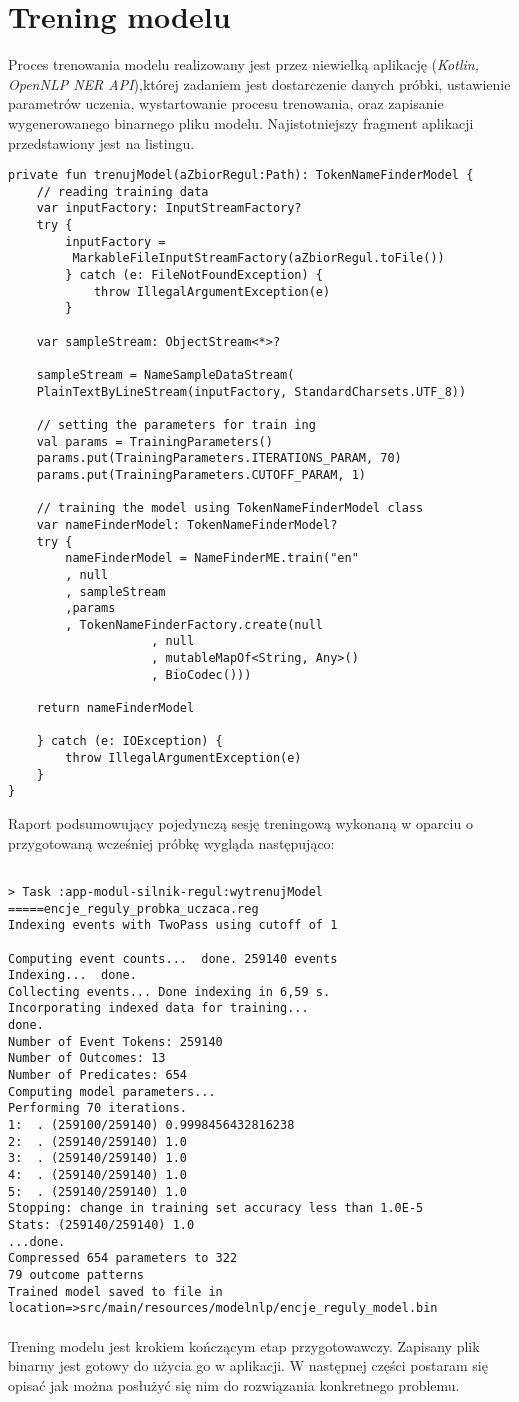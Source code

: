 \section{Trening modelu}

Proces trenowania modelu realizowany jest przez niewielką aplikację (\textit{Kotlin, OpenNLP NER API}),której zadaniem jest dostarczenie danych próbki, ustawienie parametrów uczenia, wystartowanie procesu trenowania, oraz zapisanie wygenerowanego binarnego pliku modelu. Najistotniejszy fragment aplikacji przedstawiony jest na listingu. 
\small
\begin{lstlisting}
private fun trenujModel(aZbiorRegul:Path): TokenNameFinderModel {
	// reading training data
	var inputFactory: InputStreamFactory?
	try {
		inputFactory =
		 MarkableFileInputStreamFactory(aZbiorRegul.toFile())
		} catch (e: FileNotFoundException) {
			throw IllegalArgumentException(e)
		}

	var sampleStream: ObjectStream<*>?

	sampleStream = NameSampleDataStream(
	PlainTextByLineStream(inputFactory, StandardCharsets.UTF_8))

	// setting the parameters for train ing
	val params = TrainingParameters()
	params.put(TrainingParameters.ITERATIONS_PARAM, 70)
	params.put(TrainingParameters.CUTOFF_PARAM, 1)

	// training the model using TokenNameFinderModel class
	var nameFinderModel: TokenNameFinderModel?
	try {
		nameFinderModel = NameFinderME.train("en"
		, null
		, sampleStream
		,params
		, TokenNameFinderFactory.create(null
					, null
					, mutableMapOf<String, Any>()
					, BioCodec()))

	return nameFinderModel

	} catch (e: IOException) {
		throw IllegalArgumentException(e)
	}
}

\end{lstlisting}
	
\normalsize
Raport podsumowujący pojedynczą sesję treningową wykonaną w oparciu o przygotowaną wcześniej próbkę wygląda następująco:

\small
\begin{lstlisting}

> Task :app-modul-silnik-regul:wytrenujModel
=====encje_reguly_probka_uczaca.reg
Indexing events with TwoPass using cutoff of 1

Computing event counts...  done. 259140 events
Indexing...  done.
Collecting events... Done indexing in 6,59 s.
Incorporating indexed data for training...  
done.
Number of Event Tokens: 259140
Number of Outcomes: 13
Number of Predicates: 654
Computing model parameters...
Performing 70 iterations.
1:  . (259100/259140) 0.9998456432816238
2:  . (259140/259140) 1.0
3:  . (259140/259140) 1.0
4:  . (259140/259140) 1.0
5:  . (259140/259140) 1.0
Stopping: change in training set accuracy less than 1.0E-5
Stats: (259140/259140) 1.0
...done.
Compressed 654 parameters to 322
79 outcome patterns
Trained model saved to file in location=>src/main/resources/modelnlp/encje_reguly_model.bin

\end{lstlisting}
\label{raport_trening}
\normalsize
\paragraph{}\noindent
Trening modelu jest krokiem kończącym etap przygotowawczy. Zapisany plik binarny jest gotowy do użycia go w aplikacji. W następnej części postaram się opisać jak można posłużyć się nim do rozwiązania konkretnego problemu.